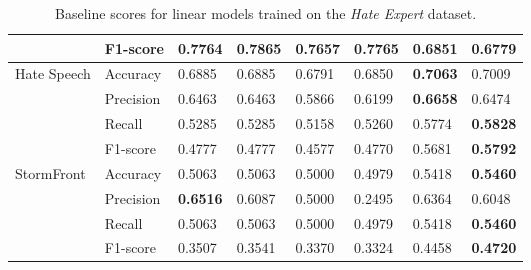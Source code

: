 \begin{table}[]
\begin{minipage}{0.42\paperheight}
{\begin{tabular}{ll|ll|ll|ll}
                                       & F1-score  & 0.7764      & \bf{0.7865}  & 0.7657      & 0.7765     & 0.6851      & 0.6779       \\ \hline
    \multirow{4}{*}{Hate Speech}       & Accuracy  & 0.6885      & 0.6885       & 0.6791      & 0.6850     & \bf{0.7063} & 0.7009       \\
                                       & Precision & 0.6463      & 0.6463       & 0.5866      & 0.6199     & \bf{0.6658} & 0.6474       \\
                                       & Recall    & 0.5285      & 0.5285       & 0.5158      & 0.5260     & 0.5774      & \bf{0.5828}  \\
                                       & F1-score  & 0.4777      & 0.4777       & 0.4577      & 0.4770     & 0.5681      & \bf{0.5792}  \\ \hline
    \multirow{4}{*}{StormFront}        & Accuracy  & 0.5063      & 0.5063       & 0.5000      & 0.4979     & 0.5418      & \bf{0.5460}  \\
                                       & Precision & \bf{0.6516} & 0.6087       & 0.5000      & 0.2495     & 0.6364      & 0.6048       \\
                                       & Recall    & 0.5063      & 0.5063       & 0.5000      & 0.4979     & 0.5418      & \bf{0.5460}  \\
                                       & F1-score  & 0.3507      & 0.3541       & 0.3370      & 0.3324     & 0.4458      & \bf{0.4720}
    \end{tabular}%
    }    
    \caption{Baseline scores for linear models trained on the \textit{Hate Expert} dataset.}
    \label{tab:linear_hateExp_baselines}
    \vfill
    

\end{minipage}
\end{table}
